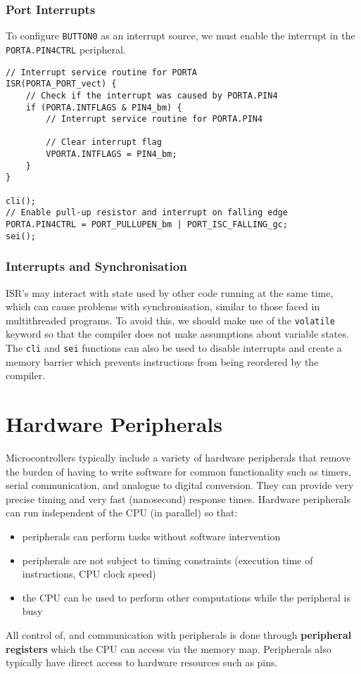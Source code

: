 \documentclass{article}
\begin{document}
\subsubsection{Port Interrupts}
To configure \texttt{BUTTON0} as an interrupt source, we must
enable the interrupt in the \texttt{PORTA.PIN4CTRL} peripheral.
\begin{verbatim}
// Interrupt service routine for PORTA
ISR(PORTA_PORT_vect) {
    // Check if the interrupt was caused by PORTA.PIN4
    if (PORTA.INTFLAGS & PIN4_bm) {
        // Interrupt service routine for PORTA.PIN4

        // Clear interrupt flag
        VPORTA.INTFLAGS = PIN4_bm;
    }
}

cli();
// Enable pull-up resistor and interrupt on falling edge
PORTA.PIN4CTRL = PORT_PULLUPEN_bm | PORT_ISC_FALLING_gc;
sei();
\end{verbatim}
\subsubsection{Interrupts and Synchronisation}
ISR's may interact with state used by other code running at the same
time, which can cause problems with synchronisation, similar to those
faced in multithreaded programs. To avoid this, we should make use
of the \texttt{volatile} keyword so that the compiler does not
make assumptions about variable states. The \texttt{cli} and
\texttt{sei} functions can also be used to disable interrupts
and create a memory barrier which prevents instructions from being
reordered by the compiler.
\section{Hardware Peripherals}
Microcontrollers typically include a variety of hardware peripherals
that remove the burden of having to write software for common
functionality such as timers, serial communication, and analogue to
digital conversion. They can provide very precise timing and very fast
(nanosecond) response times. Hardware peripherals can run independent of
the CPU (in parallel) so that:
\begin{itemize}
    \item peripherals can perform tasks without software intervention
    \item peripherals are not subject to timing constraints (execution
          time of instructions, CPU clock speed)
    \item the CPU can be used to perform other computations while the
          peripheral is busy
\end{itemize}
All control of, and communication with peripherals is done through
\textbf{peripheral registers} which the CPU can access via the memory
map. Peripherals also typically have direct access to hardware resources
such as pins.
\end{document}
